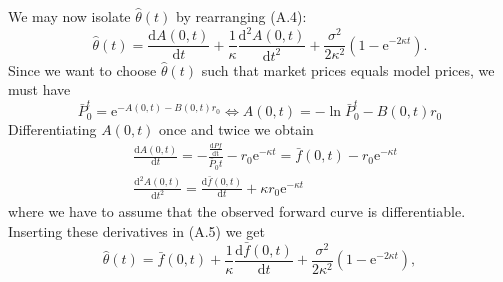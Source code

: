 \documentclass[12pt,twoside]{reedthesis}
\begin{document}
We may now isolate \(\hat{\theta}(t)\) by rearranging (A.4):
\[
\hat{\theta}(t)=\frac{\mathrm{d} A(0, t)}{\mathrm{d} t}+\frac{1}{\kappa} \frac{\mathrm{d}^{2} A(0, t)}{\mathrm{d} t^{2}}+\frac{\sigma^{2}}{2 \kappa^{2}}\left(1-\mathrm{e}^{-2 \kappa t}\right) .
\]
Since we want to choose \(\hat{\theta}(t)\) such that market prices equals model prices, we must have
\[
\bar{P}_{0}^{t}=\mathrm{e}^{-A(0, t)-B(0, t) r_{0}} \Leftrightarrow A(0, t)=-\ln \bar{P}_{0}^{t}-B(0, t) r_{0}
\]
Differentiating \(A(0, t)\) once and twice we obtain
\[
\begin{aligned}
&\frac{\mathrm{d} A(0, t)}{\mathrm{d} t}=-\frac{\frac{\mathrm{d} P f}{\mathrm{dt}}}{\bar{P}_{0} t}-r_{0} \mathrm{e}^{-\kappa t}=\bar{f}(0, t)-r_{0} \mathrm{e}^{-\kappa t} \\
&\frac{\mathrm{d}^{2} A(0, t)}{\mathrm{d} t^{2}}=\frac{\mathrm{d} \bar{f}(0, t)}{\mathrm{d} t}+\kappa r_{0} \mathrm{e}^{-\kappa t}
\end{aligned}
\]
where we have to assume that the observed forward curve is differentiable. Inserting these derivatives in (A.5) we get
\[
\hat{\theta}(t)=\bar{f}(0, t)+\frac{1}{\kappa} \frac{\mathrm{d} \bar{f}(0, t)}{\mathrm{d} t}+\frac{\sigma^{2}}{2 \kappa^{2}}\left(1-\mathrm{e}^{-2 \kappa t}\right),
\]
\end{document}
